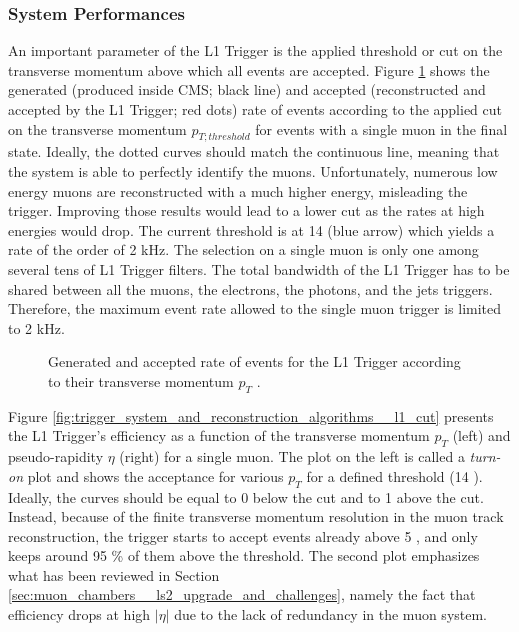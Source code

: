    			\subsubsection{System Performances}
    			\label{sec:trigger_system_and_reconstruction_algorithms__system_performances}

    				An important parameter of the L1 Trigger is the applied threshold or cut on the transverse momentum above which all events are accepted. Figure \ref{fig:trigger_system_and_reconstruction_algorithms__acceptance} shows the generated (produced inside CMS; black line) and accepted (reconstructed and accepted by the L1 Trigger; red dots) rate of events according to the applied cut on the transverse momentum $ p_{T; threshold} $ for events with a single muon in the final state. Ideally, the dotted curves should match the continuous line, meaning that the system is able to perfectly identify the muons. Unfortunately, numerous low energy muons are reconstructed with a much higher energy, misleading the trigger. Improving those results would lead to a lower cut as the rates at high energies would drop. The current threshold is at 14 \GeVc{} (blue arrow) which yields a rate of the order of 2 kHz. The selection on a single muon is only one among several tens of L1 Trigger filters. The total bandwidth of the L1 Trigger has to be shared between all the muons, the electrons, the photons, and the jets triggers. Therefore, the maximum event rate allowed to the single muon trigger is limited to 2 kHz. \\

    				\begin{figure}[h!]
    					\centering
    					\caption{Generated and accepted rate of events for the L1 Trigger according to their transverse momentum $ p_T $ \Cite{CMS_Performances}.}
    					\label{fig:trigger_system_and_reconstruction_algorithms__acceptance}
    				\end{figure}

    				Figure \ref{fig:trigger_system_and_reconstruction_algorithms__l1_cut} presents the L1 Trigger's efficiency as a function of the transverse momentum $ p_T $ (left) and pseudo-rapidity $ \eta $ (right) for a single muon. The plot on the left is called a \emph{turn-on} plot and shows the acceptance for various $ p_T $ for a defined threshold (14 \GeVc{}). Ideally, the curves should be equal to 0 below the cut and to 1 above the cut. Instead, because of the finite transverse momentum resolution in the muon track reconstruction, the trigger starts to accept events already above 5 \GeVc{}, and only keeps around 95 \% of them above the threshold. The second plot emphasizes what has been reviewed in Section \ref{sec:muon_chambers__ls2_upgrade_and_challenges}, namely the fact that efficiency drops at high $ | \eta | $ due to the lack of redundancy in the muon system.


